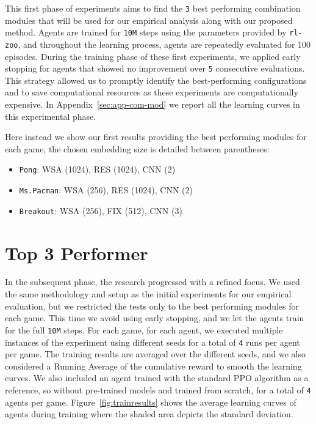 This first phase of experiments aims to find the \texttt{3} best performing combination modules that will be used for our empirical analysis along with our proposed method.
Agents are trained for \texttt{10M} steps using the parameters provided by \texttt{rl-zoo}, and throughout the learning process, agents are repeatedly evaluated for 100 episodes.
During the training phase of these first experiments, we applied early stopping for agents that showed no improvement over \texttt{5} consecutive evaluations.
This strategy allowed us to promptly identify the best-performing configurations and to save computational resources as these experiments are computationally expensive.
In Appendix~\ref{sec:app-com-mod} we report all the learning curves in this experimental phase.

Here instead we show our first results providing the best performing modules for each game, the chosen embedding size is detailed between parentheses:
\begin{itemize}
    \item \texttt{Pong}: WSA (1024), RES (1024), CNN (2)
    \item \texttt{Ms.Pacman}: WSA (256), RES (1024), CNN (2)
    \item \texttt{Breakout}: WSA (256), FIX (512), CNN (3)
\end{itemize}

\section{Top 3 Performer}\label{sec:top-3-performer}
In the subsequent phase, the research progressed with a refined focus.
We used the same methodology and setup as the initial experiments for our empirical evaluation, but we restricted the tests only to the best performing modules for each game.
This time we avoid using early stopping, and we let the agents train for the full \texttt{10M} steps.
For each game, for each agent, we executed multiple instances of the experiment using different seeds for a total of \texttt{4} runs per agent per game.
The training results are averaged over the different seeds, and we also considered a Running Average of the cumulative reward to smooth the learning curves.
We also included an agent trained with the standard PPO algorithm as a reference, so without pre-trained models and trained from scratch, for a total of \texttt{4} agents per game.
Figure~\ref{fig:trainresults} shows the average learning curves of agents during training where the shaded area depicts the standard deviation.


